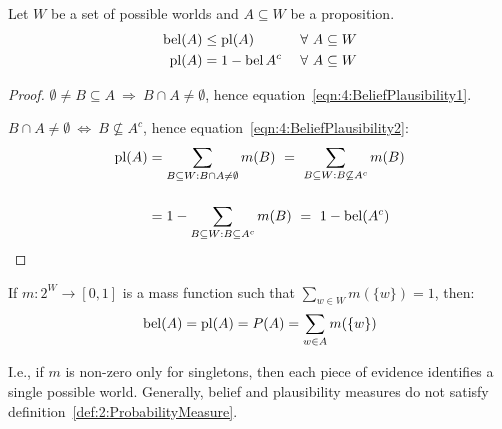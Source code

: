 \begin{thm}
  Let $W$ be a set of possible worlds and $A \subseteq W$ be a proposition.
  \begin{alignat}{2}
    \label{eqn:4:BeliefPlausibility1}
    \operatorname*{bel}(A) & \leq \operatorname*{pl}(A)
    \       & \forall\
    A \subseteq W               \\
    \label{eqn:4:BeliefPlausibility2}
    \operatorname*{pl}(A)  & = 1 - \operatorname*{bel}{A^{c}}
    \       & \forall\
    A \subseteq W
  \end{alignat}
  \begin{proof}
    $\emptyset \neq B \subseteq A \ \Rightarrow \ B \cap A \neq \emptyset$,
    hence equation~\ref{eqn:4:BeliefPlausibility1}.

    $B \cap A \neq \emptyset \ \Leftrightarrow\  B \not\subseteq A^{c}$, hence
    equation~\ref{eqn:4:BeliefPlausibility2}:
    \begin{align*}
      \operatorname*{pl}(A)
       & = \sum_{B \subseteq W : B \cap A \neq \emptyset} m(B)
      \ =\ \sum_{B \subseteq W : B \not\subseteq A^{c}} m(B)   \\[3ex]
       & = 1 - \sum_{B \subseteq W : B \subseteq A^{c}} m(B)
      \ =\ 1 - \operatorname*{bel}(A^{c})
    \end{align*}
  \end{proof}
\end{thm}

\begin{thm}
  If $m : 2^W \rightarrow [0, 1]$ is a mass function such that
  $\sum_{w \in W} m(\{w\}) = 1$, then:
  \begin{equation}
    \operatorname*{bel}(A) = \operatorname*{pl}(A) = P(A) = \sum_{w \in A} m(\{w\})
  \end{equation}
\end{thm}

I.e., if $m$ is non-zero only for singletons, then each piece of evidence
identifies a single possible world.
Generally, belief and plausibility measures do not satisfy
definition~\ref{def:2:ProbabilityMeasure}.

